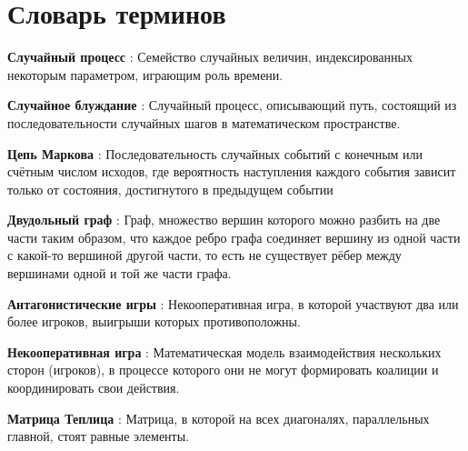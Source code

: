 \chapter*{Словарь терминов}             %

\textbf{Случайный процесс} : Семейство случайных величин, индексированных некоторым параметром, играющим роль времени.

\textbf{Случайное блуждание} : Случайный процесс, описывающий путь, состоящий из последовательности случайных шагов в математическом пространстве.

\textbf{Цепь Маркова} : Последовательность случайных событий с конечным или счётным числом исходов, где вероятность наступления каждого события зависит только от состояния, достигнутого в предыдущем событии

\textbf{Двудольный граф} : Граф, множество вершин которого можно разбить на две части таким образом, 
что каждое ребро графа соединяет вершину из одной части с какой-то вершиной другой части, то есть не существует рёбер между вершинами одной и той же части графа.

\textbf{Антагонистические игры} : Некооперативная игра, в которой участвуют два или более игроков, выигрыши которых противоположны.

\textbf{Некооперативная игра} : Математическая модель взаимодействия нескольких сторон (игроков), в процессе которого они не могут формировать коалиции и координировать свои действия.

\textbf{Матрица Теплица} : Матрица, в которой на всех диагоналях, параллельных главной, стоят равные элементы.

